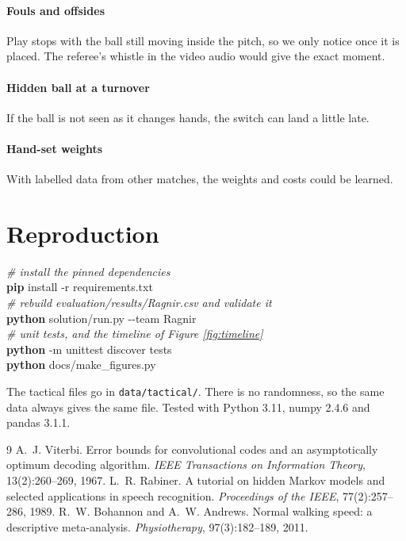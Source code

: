 \documentclass[11pt,a4paper]{article}
\newcommand{\lab}[1]{\texttt{#1}}
\newcommand{\cmd}[1]{\textcolor{codecmd}{\textbf{#1}}}
\newcommand{\sub}[1]{\textcolor{codesub}{#1}}
\newcommand{\flag}[1]{\textcolor{codeflag}{#1}}
\newcommand{\com}[1]{\textcolor{codecom}{\textit{#1}}}
\begin{document}
\paragraph{Fouls and offsides} Play stops with the ball still moving inside the pitch, so we only
notice once it is placed. The referee's whistle in the video audio would give the exact moment.

\paragraph{Hidden ball at a turnover} If the ball is not seen as it changes hands, the switch can
land a little late.

\paragraph{Hand-set weights} With labelled data from other matches, the weights and costs could be
learned.

\section{Reproduction}

\begin{tcolorbox}[enhanced,colback=soft,colframe=rule,boxrule=0.4pt,arc=2pt,left=8pt,right=8pt,top=5pt,bottom=5pt]
\small\ttfamily
\com{\# install the pinned dependencies}\\
\cmd{pip} \sub{install} \flag{-r} requirements.txt\\[3pt]
\com{\# rebuild evaluation/results/Ragnir.csv and validate it}\\
\cmd{python} solution/run.py \flag{-{}-team} Ragnir\\[3pt]
\com{\# unit tests, and the timeline of Figure \ref{fig:timeline}}\\
\cmd{python} \flag{-m} \sub{unittest} \sub{discover} tests\\
\cmd{python} docs/make\_figures.py
\end{tcolorbox}

The tactical files go in \lab{data/tactical/}. There is no randomness, so the same data always
gives the same file. Tested with Python 3.11, numpy 2.4.6 and pandas 3.1.1.

\begin{thebibliography}{9}
\small
{} A.~J. Viterbi. Error bounds for convolutional codes and an asymptotically
optimum decoding algorithm. \emph{IEEE Transactions on Information Theory}, 13(2):260--269, 1967.
 L.~R. Rabiner. A tutorial on hidden Markov models and selected applications in
speech recognition. \emph{Proceedings of the IEEE}, 77(2):257--286, 1989.
 R.~W. Bohannon and A.~W. Andrews. Normal walking speed: a descriptive
meta-analysis. \emph{Physiotherapy}, 97(3):182--189, 2011.
\end{thebibliography}
\end{document}
